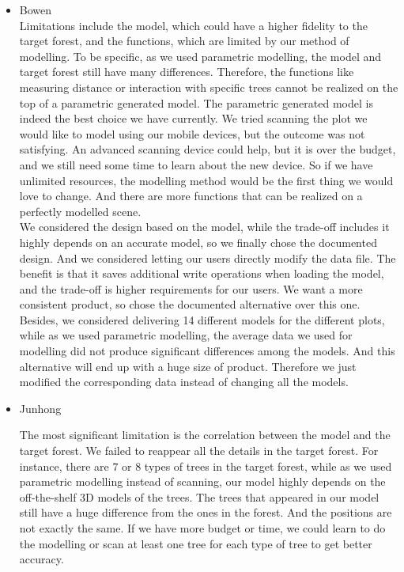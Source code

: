 \documentclass[12pt, titlepage]{article}
\begin{document}
\begin{enumerate}
\begin{itemize}
    \item Bowen\\
Limitations include the model, which could have a higher fidelity to the target forest, and the functions, which are limited by our method of modelling. To be specific, as we used parametric modelling, the model and target forest still have many differences. Therefore, the functions like measuring distance or interaction with specific trees cannot be realized on the top of a parametric generated model. The parametric generated model is indeed the best choice we have currently. We tried scanning the plot we would like to model using our mobile devices, but the outcome was not satisfying. An advanced scanning device could help, but it is over the budget, and we still need some time to learn about the new device. So if we have unlimited resources, the modelling method would be the first thing we would love to change. And there are more functions that can be realized on a perfectly modelled scene. \\

We considered the design based on the model, while the trade-off includes it highly depends on an accurate model, so we finally chose the documented design. And we considered letting our users directly modify the data file. The benefit is that it saves additional write operations when loading the model, and the trade-off is higher requirements for our users. We want a more consistent product, so chose the documented alternative over this one. Besides, we considered delivering 14 different models for the different plots, while as we used parametric modelling, the average data we used for modelling did not produce significant differences among the models. And this alternative will end up with a huge size of product. Therefore we just modified the corresponding data instead of changing all the models.


    
    \item Junhong

    The most significant limitation is the correlation between the model and the target forest. We failed to reappear all the details in the target forest. For instance, there are 7 or 8 types of trees in the target forest, while as we used parametric modelling instead of scanning, our model highly depends on the off-the-shelf 3D models of the trees. The trees that appeared in our model still have a huge difference from the ones in the forest. And the positions are not exactly the same. If we have more budget or time, we could learn to do the modelling or scan at least one tree for each type of tree to get better accuracy.\\


\end{itemize}
\end{enumerate}
\end{document}
